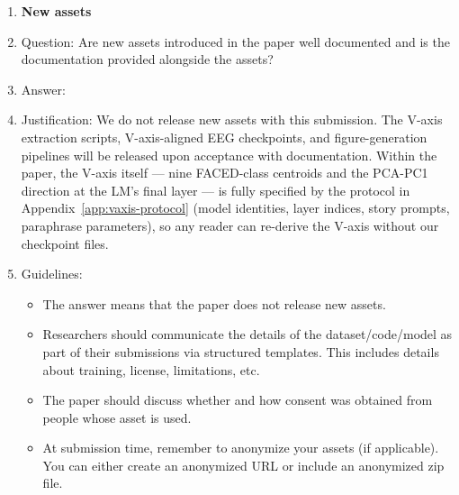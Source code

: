 \begin{enumerate}
\item {\bf New assets}
    \item[] Question: Are new assets introduced in the paper well documented and is the documentation provided alongside the assets?
    \item[] Answer: \answerNo{}
    \item[] Justification: We do not release new assets with this submission. The V-axis extraction scripts, V-axis-aligned EEG checkpoints, and figure-generation pipelines will be released upon acceptance with documentation. Within the paper, the V-axis itself --- nine FACED-class centroids and the PCA-PC1 direction at the LM's final layer --- is fully specified by the protocol in Appendix~\ref{app:vaxis-protocol} (model identities, layer indices, story prompts, paraphrase parameters), so any reader can re-derive the V-axis without our checkpoint files.
    \item[] Guidelines:
    \begin{itemize}
        \item The answer \answerNA{} means that the paper does not release new assets.
        \item Researchers should communicate the details of the dataset\slash code\slash model as part of their submissions via structured templates. This includes details about training, license, limitations, etc.
        \item The paper should discuss whether and how consent was obtained from people whose asset is used.
        \item At submission time, remember to anonymize your assets (if applicable). You can either create an anonymized URL or include an anonymized zip file.
    \end{itemize}


\end{enumerate}
